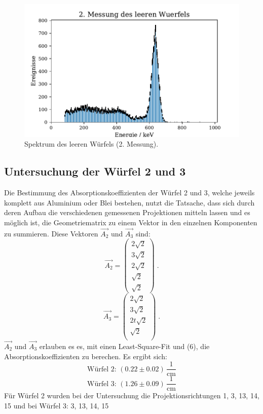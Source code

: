 \begin{figure}[H]
  \centering
  \includegraphics{plots/Alu_leer2.pdf}
  \caption{Spektrum des leeren Würfels (2. Messung).\cite{anleitung}}
  \label{Leermessung}
\end{figure}
\subsection{Untersuchung der Würfel 2 und 3}
Die Bestimmung des Absorptionskoeffizienten der Würfel 2 und 3, welche jeweils komplett aus Aluminium oder Blei bestehen, nutzt die Tatsache, dass sich durch deren Aufbau die verschiedenen gemessenen Projektionen mitteln lassen
und es möglich ist, die Geometriematrix zu einem Vektor in den einzelnen Komponenten zu summieren. Diese Vektoren $\vec{A_2}$ und $\vec{A_3}$ sind:
\begin{equation}
	\vec{A_2}=
	\begin{pmatrix}
		2\sqrt{2} \\
		3\sqrt{2} \\
		2\sqrt{2} \\
		\sqrt{2}\\
    \sqrt{2}
	\end{pmatrix} \; .
\end{equation}
\begin{equation}
	\vec{A_3}=
	\begin{pmatrix}
		2\sqrt{2} \\
		3\sqrt{2} \\
		2t\sqrt{2} \\
		\sqrt{2}\\
	\end{pmatrix} \; .
\end{equation}
$\vec{A_2}$ und $\vec{A_3}$ erlauben es es, mit einen Least-Square-Fit und (6), die Absorptionskoeffizienten zu berechen. Es ergibt sich:
\begin{equation}
  \text{Würfel 2: } \left(0.22 \pm 0.02\right) \, \frac{1}{\si{\centi\meter}} \nonumber
\end{equation}
\begin{equation}
  \text{Würfel 3: } \left(1.26 \pm 0.09\right) \, \frac{1}{\si{\centi\meter}} \nonumber
\end{equation}
Für Würfel 2 wurden bei der Untersuchung die Projektionsrichtungen 1, 3, 13, 14, 15 und bei Würfel 3: 3, 13, 14, 15
